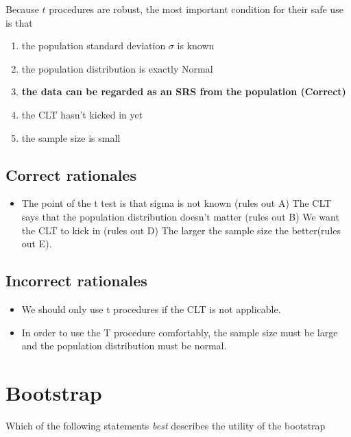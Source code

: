 \documentclass[letterpaper,9pt,twoside,printwatermark=false]{pinp}
\providecommand{\tightlist}{%
  \setlength{\itemsep}{0pt}\setlength{\parskip}{0pt}}
\begin{document}
Because \(t\) procedures are robust, the most important condition for
their safe use is that

\begin{enumerate}
\def\labelenumi{\alph{enumi}.}
\tightlist
\item
  the population standard deviation \(\sigma\) is known
\item
  the population distribution is exactly Normal
\item
  \textbf{the data can be regarded as an SRS from the population
  (Correct)}
\item
  the CLT hasn't kicked in yet
\item
  the sample size is small
\end{enumerate}

\hypertarget{correct-rationales-5}{%
\subsection{Correct rationales}\label{correct-rationales-5}}

\begin{itemize}
\tightlist
\item
  The point of the t test is that sigma is not known (rules out A) The
  CLT says that the population distribution doesn't matter (rules out B)
  We want the CLT to kick in (rules out D) The larger the sample size
  the better(rules out E).
\end{itemize}

\hypertarget{incorrect-rationales-5}{%
\subsection{Incorrect rationales}\label{incorrect-rationales-5}}

\begin{itemize}
\tightlist
\item
  We should only use t procedures if the CLT is not applicable.
\item
  In order to use the T procedure comfortably, the sample size must be
  large and the population distribution must be normal.
\end{itemize}

\hypertarget{bootstrap}{%
\section{Bootstrap}\label{bootstrap}}

Which of the following statements \emph{best} describes the utility of
the bootstrap
\end{document}
